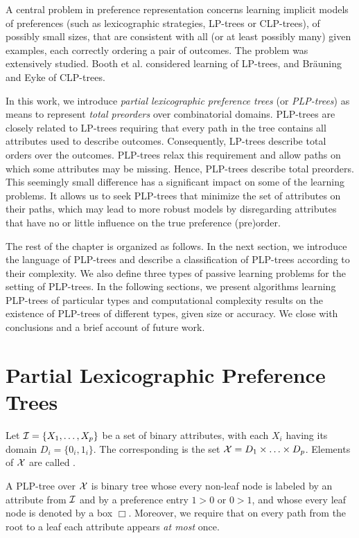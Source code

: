 A central problem in preference representation concerns learning 
implicit models of preferences (such as lexicographic strategies,
LP-trees or CLP-trees), of possibly small sizes, that are consistent 
with all (or at least possibly many) given examples, each correctly 
ordering a pair of outcomes. The problem was extensively studied. Booth
et al.  considered learning of LP-trees, and 
Br\"auning and Eyke  of CLP-trees. 

In this work, we introduce \emph{partial lexicographic preference trees} (or 
\emph{PLP-trees}) as means to represent \emph{total preorders} over 
combinatorial domains. PLP-trees are closely related to LP-trees 
requiring that every path in the tree contains all attributes 
used to describe outcomes. Consequently, LP-trees describe total 
orders over the outcomes. PLP-trees relax this requirement and allow 
paths on which some attributes may be missing. Hence, 
PLP-trees describe total preorders. This seemingly small difference
has a significant impact on some of the learning problems. It allows
us to seek PLP-trees that minimize the set of attributes on their paths,
which may lead to more robust models by disregarding attributes 
that have no or little influence on the true preference (pre)order.

The rest of the chapter is organized as follows. In the next section, 
we introduce the language of PLP-trees and describe a classification 
of PLP-trees according to their complexity. We also define three types of passive 
learning problems for the setting of PLP-trees. In the following 
sections, we present algorithms learning PLP-trees of particular
types and computational complexity results on the existence of 
PLP-trees of different types, given size or accuracy. We close 
with conclusions and a brief account of future work.


\section{Partial Lexicographic Preference Trees}
Let $\mathcal{I}=\{X_1,\ldots,X_p\}$ be a set of binary attributes, with each
$X_i$ having its domain $D_i=\{0_i, 1_i\}$. The corresponding 
 is the set $\mathcal{X}=D_1 \times \ldots \times D_p$.
Elements of  $\mathcal{X}$ are called .

A PLP-tree over $\mathcal{X}$ is binary tree whose every
non-leaf node is labeled by an attribute from $\mathcal{I}$ and by a preference
entry $1>0$ or $0>1$, and whose every leaf node is denoted by a box 
$\Box$. Moreover, we require that on every path from the root to a leaf
each attribute appears \emph{at most} once. 

